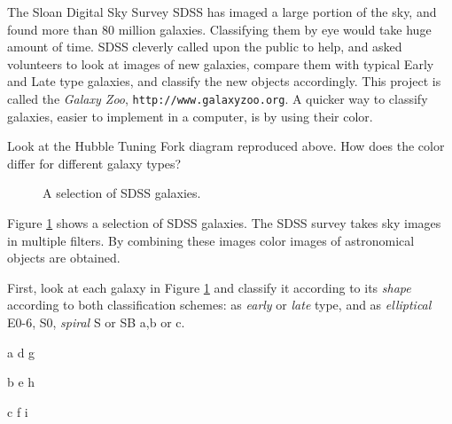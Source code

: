 
\noindent

The Sloan Digital Sky Survey SDSS has imaged a large portion of the
sky, and found more than 80 million galaxies. Classifying them by eye
would take huge amount of time. SDSS cleverly called upon the public
to help, and asked volunteers to look at images of new galaxies,
compare them with typical Early and Late type galaxies, and classify
the new objects accordingly. This project is called the \emph{Galaxy
Zoo}, {\tt http://www.galaxyzoo.org}. A quicker way to classify
galaxies, easier to implement in a computer, is by using their color.

 Look at the Hubble Tuning Fork diagram reproduced above. How does the color differ for different galaxy types?



\begin{figure}[ht]
        \centerline{}
        \caption{A selection of SDSS galaxies. }\label{SDSSgals}
         \end{figure}


\noindent 
Figure \ref{SDSSgals} shows a selection of SDSS galaxies. The SDSS survey takes sky images in multiple filters. By combining these images color images of astronomical objects are obtained. 

\noindent First, look at each galaxy in Figure \ref{SDSSgals} and classify it according to its \emph{shape} according to both classification schemes: as \emph{early} or \emph{late} type, and as \emph{elliptical} E0-6, S0, \emph{spiral} S or SB a,b or c.

\vspace{20pt}

\noindent a \makebox[2cm]{\hrulefill}  \makebox[2cm]{\hrulefill}\makebox[1cm] d \makebox[2cm]{\hrulefill}  \makebox[2cm]{\hrulefill}\makebox[1cm] g \makebox[2cm]{\hrulefill}  \makebox[2cm]{\hrulefill}

\noindent b \makebox[2cm]{\hrulefill}  \makebox[2cm]{\hrulefill}\makebox[1cm] e \makebox[2cm]{\hrulefill}  \makebox[2cm]{\hrulefill}\makebox[1cm] h \makebox[2cm]{\hrulefill}  \makebox[2cm]{\hrulefill}

\noindent c \makebox[2cm]{\hrulefill} \makebox[2cm]{\hrulefill}\makebox[1cm] f \makebox[2cm]{\hrulefill}  \makebox[2cm]{\hrulefill}\makebox[1cm] i \makebox[2cm]{\hrulefill}  \makebox[2cm]{\hrulefill}

\vspace{20pt}


